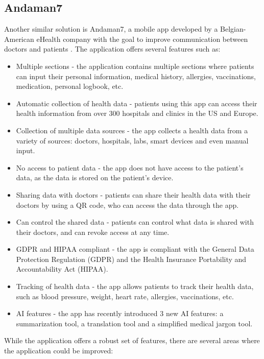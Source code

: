 \subsection{Andaman7}

Another similar solution is Andaman7, a mobile app developed by a Belgian-American eHealth company with the goal to improve communication between doctors and patients \parencite{andaman}. The application offers several features such as:

\begin{itemize}
    \item Multiple sections - the application contains multiple sections where patients can input their personal information, medical history, allergies, vaccinations, medication, personal logbook, etc.
    \item Automatic collection of health data - patients using this app can access their health information from over 300 hospitals and clinics in the US and Europe.
    \item Collection of multiple data sources - the app collects a health data from a variety of sources: doctors, hospitals, labs, smart devices and even manual input.
    \item No access to patient data - the app does not have access to the patient's data, as the data is stored on the patient's device.
    \item Sharing data with doctors - patients can share their health data with their doctors by using a QR code, who can access the data through the app.
    \item Can control the shared data - patients can control what data is shared with their doctors, and can revoke access at any time.
    \item GDPR and HIPAA compliant - the app is compliant with the General Data Protection Regulation (GDPR) and the Health Insurance Portability and Accountability Act (HIPAA).
    \item Tracking of health data - the app allows patients to track their health data, such as blood pressure, weight, heart rate, allergies, vaccinations, etc.
    \item AI features - the app has recently introduced 3 new AI features: a summarization tool, a translation tool and a simplified medical jargon tool.
\end{itemize}

While the application offers a robust set of features, there are several areas where the application could be improved:

